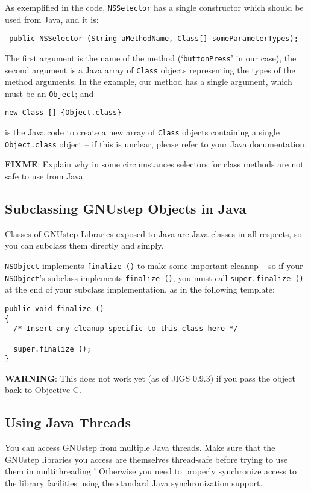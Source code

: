 As exemplified in the code, \texttt{NSSelector} has a single
constructor which should be used from Java, and it is:
\begin{verbatim}
 public NSSelector (String aMethodName, Class[] someParameterTypes);
\end{verbatim}
The first argument is the name of the method (`\texttt{buttonPress}'
in our case), the second argument is a Java array of \texttt{Class}
objects representing the types of the method arguments.  In the
example, our method has a single argument, which must be an 
\texttt{Object}; and 
\begin{verbatim}
new Class [] {Object.class}
\end{verbatim}
is the Java code to create a new array of \texttt{Class} objects
containing a single \texttt{Object.class} object -- if this is
unclear, please refer to your Java documentation.

{\bf FIXME}: Explain why in some circumstances selectors for class
methods are not safe to use from Java.

\subsection{Subclassing GNUstep Objects in Java}

Classes of GNUstep Libraries exposed to Java are Java classes in all
respects, so you can subclass them directly and simply.  

\texttt{NSObject} implements \texttt{finalize ()} to make some important 
cleanup -- so if your \texttt{NSObject}'s subclass implements
\texttt{finalize ()}, you must call \texttt{super.finalize ()} 
at the end of your subclass implementation, as in the following template:
\begin{verbatim}
public void finalize ()
{
  /* Insert any cleanup specific to this class here */

  super.finalize ();
}
\end{verbatim}

{\bf WARNING}: This does not work yet (as of JIGS 0.9.3) if you pass
the object back to Objective-C.

\subsection{Using Java Threads}

You can access GNUstep from multiple Java threads.  Make sure that the
GNUstep libraries you access are themselves thread-safe before trying
to use them in multithreading !  Otherwise you need to properly
synchronize access to the library facilities using the standard Java
synchronization support.

